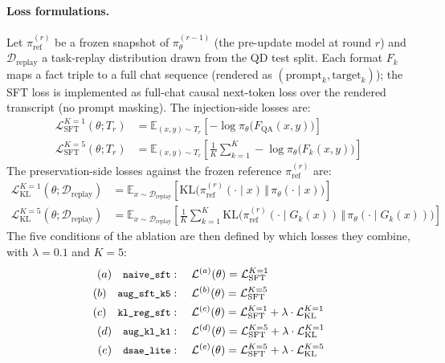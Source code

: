 \documentclass[11pt]{article}
\newcommand{\code}[1]{\texttt{\small #1}}
\begin{document}
\paragraph{Loss formulations.}
Let $\pi_{\mathrm{ref}}^{(r)}$ be a frozen snapshot of
$\pi_\theta^{(r-1)}$ (the pre-update model at round $r$) and
$\mathcal{D}_{\mathrm{replay}}$ a task-replay distribution drawn from the QD
test split. Each format $F_k$ maps a fact triple to a full chat sequence
(rendered as $(\mathrm{prompt}_k, \mathrm{target}_k)$); the SFT loss is
implemented as full-chat causal next-token loss over the rendered
transcript (no prompt masking). The injection-side losses are:
\begin{align}
\mathcal{L}_{\mathrm{SFT}}^{K=1}(\theta; T_r)
  &= \mathbb{E}_{(x,y) \sim T_r} \left[ - \log \pi_\theta\bigl( F_{\mathrm{QA}}(x,y) \bigr) \right] \\
\mathcal{L}_{\mathrm{SFT}}^{K=5}(\theta; T_r)
  &= \mathbb{E}_{(x,y) \sim T_r} \left[ \frac{1}{K} \sum_{k=1}^{K} - \log \pi_\theta\bigl( F_k(x,y) \bigr) \right]
\end{align}
The preservation-side losses against the frozen reference
$\pi_{\mathrm{ref}}^{(r)}$ are:
\begin{align}
\mathcal{L}_{\mathrm{KL}}^{K=1}(\theta; \mathcal{D}_{\mathrm{replay}})
  &= \mathbb{E}_{x \sim \mathcal{D}_{\mathrm{replay}}}
      \left[ \mathrm{KL}\bigl( \pi_{\mathrm{ref}}^{(r)}(\cdot \mid x) \,\Vert\, \pi_\theta(\cdot \mid x) \bigr) \right] \\
\mathcal{L}_{\mathrm{KL}}^{K=5}(\theta; \mathcal{D}_{\mathrm{replay}})
  &= \mathbb{E}_{x \sim \mathcal{D}_{\mathrm{replay}}}
      \left[ \frac{1}{K} \sum_{k=1}^{K} \mathrm{KL}\bigl( \pi_{\mathrm{ref}}^{(r)}(\cdot \mid G_k(x)) \,\Vert\, \pi_\theta(\cdot \mid G_k(x)) \bigr) \right]
\end{align}
The five conditions of the ablation are then defined by which losses they
combine, with $\lambda = 0.1$ and $K = 5$:
\begin{align*}
(a) \quad \code{naive\_sft}     &: \quad \mathcal{L}^{(a)}(\theta) = \mathcal{L}_{\mathrm{SFT}}^{K=1} \\
(b) \quad \code{aug\_sft\_k5}   &: \quad \mathcal{L}^{(b)}(\theta) = \mathcal{L}_{\mathrm{SFT}}^{K=5} \\
(c) \quad \code{kl\_reg\_sft}   &: \quad \mathcal{L}^{(c)}(\theta) = \mathcal{L}_{\mathrm{SFT}}^{K=1} + \lambda \cdot \mathcal{L}_{\mathrm{KL}}^{K=1} \\
(d) \quad \code{aug\_kl\_k1}    &: \quad \mathcal{L}^{(d)}(\theta) = \mathcal{L}_{\mathrm{SFT}}^{K=5} + \lambda \cdot \mathcal{L}_{\mathrm{KL}}^{K=1} \\
(e) \quad \code{dsae\_lite}     &: \quad \mathcal{L}^{(e)}(\theta) = \mathcal{L}_{\mathrm{SFT}}^{K=5} + \lambda \cdot \mathcal{L}_{\mathrm{KL}}^{K=5}
\end{align*}
\end{document}
